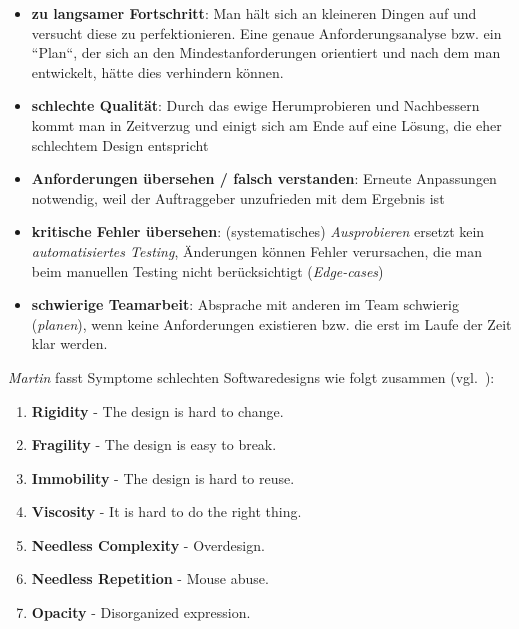 \begin{itemize}
    \item \textbf{zu langsamer Fortschritt}: Man hält sich an kleineren Dingen auf und versucht diese zu perfektionieren.
    Eine genaue Anforderungsanalyse bzw. ein ``Plan``, der sich an den Mindestanforderungen orientiert und nach dem man entwickelt, hätte dies verhindern können.
    \item \textbf{schlechte Qualität}: Durch das ewige Herumprobieren und Nachbessern kommt man in Zeitverzug und einigt sich am Ende auf eine Lösung, die eher schlechtem Design entspricht
    \item  \textbf{Anforderungen übersehen / falsch verstanden}: Erneute Anpassungen notwendig, weil der Auftraggeber unzufrieden mit dem Ergebnis ist
    \item \textbf{kritische Fehler übersehen}: (systematisches) \textit{Ausprobieren} ersetzt kein \textit{automatisiertes Testing}, Änderungen können Fehler verursachen, die man beim manuellen Testing nicht berücksichtigt (\textit{Edge-cases})
    \item \textbf{schwierige Teamarbeit}: Absprache mit anderen im Team schwierig (\textit{planen}), wenn keine Anforderungen existieren bzw. die erst im Laufe der Zeit klar werden.
\end{itemize}


\begin{tcolorbox}[title=Symptoms of Poor Design]
    \textit{Martin} fasst Symptome schlechten Softwaredesigns wie folgt zusammen (vgl.~\cite[85]{Mar03}):

    \begin{enumerate}
        \item \textbf{Rigidity} - The design is hard to change.
        \item \textbf{Fragility} - The design is easy to break.
        \item \textbf{Immobility} - The design is hard to reuse.
        \item \textbf{Viscosity} - It is hard to do the right thing.
        \item \textbf{Needless Complexity} - Overdesign.
        \item \textbf{Needless Repetition} - Mouse abuse.
        \item \textbf{Opacity} - Disorganized expression.
    \end{enumerate}
\end{tcolorbox}

